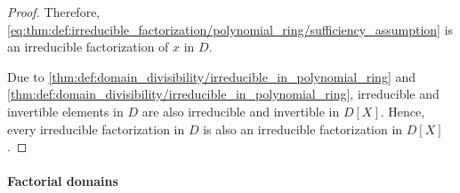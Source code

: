 \begin{proof}
  Therefore, \eqref{eq:thm:def:irreducible_factorization/polynomial_ring/sufficiency_assumption} is an irreducible factorization of \( x \) in \( D \).

  \NecessitySubProof* Due to \cref{thm:def:domain_divisibility/irreducible_in_polynomial_ring} and \cref{thm:def:domain_divisibility/irreducible_in_polynomial_ring}, irreducible and invertible elements in \( D \) are also irreducible and invertible in \( D[X] \). Hence, every irreducible factorization in \( D \) is also an irreducible factorization in \( D[X] \).
\end{proof}

\paragraph{Factorial domains}

